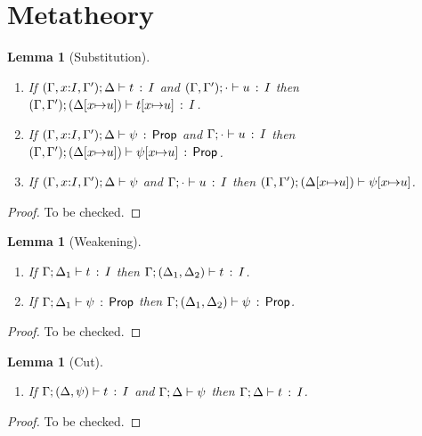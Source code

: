 \documentclass[10pt,a4paper]{article}
\newtheorem{lemma}[theorem]{Lemma}
\begin{document}
\clearpage

\section{Metatheory}

\begin{lemma}[Substitution]
\label{lemma:subst}
\mbox{}
 \begin{enumerate}
	\item If $(\Gamma,x{:}I,\Gamma');\Delta \vdash t\, :\, I$ and
	  $(\Gamma,\Gamma');\cdot \vdash u\, :\, I$ then
	  $(\Gamma,\Gamma');(\Delta[x{\mapsto}u]) \vdash t[x{\mapsto}u]\, :\, I$.
	\item If $(\Gamma,x{:}I,\Gamma');\Delta \vdash \psi\, :\, \mathsf{Prop}$ and
	  $\Gamma;\cdot \vdash u\, :\, I$ then
	  $(\Gamma,\Gamma');(\Delta[x{\mapsto}u]) \vdash \psi[x{\mapsto}u]\, :\, \mathsf{Prop}$.
	\item If $(\Gamma,x{:}I,\Gamma');\Delta \vdash \psi$ and
	  $\Gamma;\cdot \vdash u\, :\, I$ then
	  $(\Gamma,\Gamma');(\Delta[x{\mapsto}u]) \vdash \psi[x{\mapsto}u]$.	
 \end{enumerate}
\end{lemma}

\begin{proof}
To be checked.
\end{proof}

\begin{lemma}[Weakening]
\mbox{}
\label{lemma:weaken}
\begin{enumerate}
	\item If $\Gamma;\Delta_1 \vdash t\, :\, I$ then
	   $\Gamma;(\Delta_1,\Delta_2) \vdash t\, :\, I$.
	\item If $\Gamma;\Delta_1 \vdash \psi\, :\, \mathsf{Prop}$ then
	   $\Gamma;(\Delta_1,\Delta_2) \vdash \psi\, :\, \mathsf{Prop}$.
\end{enumerate}
\end{lemma}

\begin{proof}
To be checked.
\end{proof}

\begin{lemma}[Cut]
\label{lemma:cut}
\mbox{}
\begin{enumerate}
  \item If $\Gamma;(\Delta,\psi) \vdash t\, :\, I$ and
     $\Gamma;\Delta \vdash \psi$ then
     $\Gamma;\Delta \vdash t\, :\, I$.
\end{enumerate}
\end{lemma}

\begin{proof}
To be checked.
\end{proof}
\end{document}
